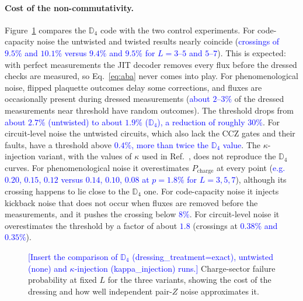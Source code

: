 \documentclass[a4paper]{article}
\newcommand{\blue}[1]{\textcolor{blue}{#1}}
\begin{document}
\paragraph{Cost of the non-commutativity.}
Figure~\ref{fig:control} compares the $\mathbb{D}_4$ code with the two control experiments. For code-capacity noise the untwisted and twisted results nearly coincide (\blue{crossings of $9.5\%$ and $10.1\%$ versus $9.4\%$ and $9.5\%$ for $L=3$--$5$ and $5$--$7$}). This is expected: with perfect measurements the JIT decoder removes every flux before the dressed checks are measured, so Eq.~\eqref{eq:aba} never comes into play. For phenomenological noise, flipped plaquette outcomes delay some corrections, and fluxes are occasionally present during dressed measurements (\blue{about $2$--$3\%$} of the dressed measurements near threshold have random outcomes). The threshold drops from \blue{about $2.7\%$ (untwisted) to about $1.9\%$ ($\mathbb{D}_4$), a reduction of roughly $30\%$}. For circuit-level noise the untwisted circuits, which also lack the CCZ gates and their faults, have a threshold above \blue{$0.4\%$, more than twice the $\mathbb{D}_4$ value}. The $\kappa$-injection variant, with the values of $\kappa$ used in Ref.~\cite{haga2026aqis}, does not reproduce the $\mathbb{D}_4$ curves. For phenomenological noise it overestimates $P_{\mathrm{charge}}$ at every point (\blue{e.g.\ $0.20$, $0.15$, $0.12$ versus $0.14$, $0.10$, $0.08$ at $p=1.8\%$ for $L=3,5,7$}), although its crossing happens to lie close to the $\mathbb{D}_4$ one. For code-capacity noise it injects kickback noise that does not occur when fluxes are removed before the measurements, and it pushes the crossing below \blue{$8\%$}. For circuit-level noise it overestimates the threshold by a factor of about \blue{$1.8$} (crossings at \blue{$0.38\%$ and $0.35\%$}).

\begin{figure}[t]
  \centering
  \fbox{\rule{0pt}{50mm}\rule{0.82\linewidth}{0pt}}
  \caption{\blue{[Insert the comparison of $\mathbb{D}_4$ (dressing\_treatment=exact), untwisted (none) and $\kappa$-injection (kappa\_injection) runs.]} Charge-sector failure probability at fixed $L$ for the three variants, showing the cost of the dressing and how well independent pair-$Z$ noise approximates it.}
  \label{fig:control}
\end{figure}
\end{document}
